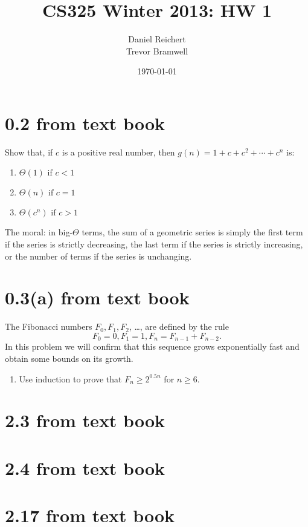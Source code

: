 \documentclass[12pt]{article}
\title{CS325 Winter 2013: HW 1}
\author{
    Daniel Reichert \\
    Trevor Bramwell
}
\date{\today}
\begin{document}
\maketitle

\section*{0.2 from text book}
Show that, if $c$ is a positive real number, then $g(n)=1+c+c^2+\cdots+c^n$ is:

\begin{enumerate}
\item $\Theta(1) \text{ if } c < 1$
\item $\Theta(n) \text{ if } c = 1$
\item $\Theta(c^n) \text{ if } c > 1$
\end{enumerate}

The moral: in big-$\Theta$ terms, the sum of a geometric series is simply the
first term if the series is
strictly decreasing, the last term if the series is strictly increasing,
or the number of terms if the
series is unchanging.

\section*{0.3(a) from text book}

The Fibonacci numbers $F_0, F_1, F_2$, \ldots, are defined by the rule
\[ F_0 = 0, F_1 = 1, F_n = F_{n - 1} + F_{n - 2}. \]
In this problem we will confirm that this sequence grows exponentially
fast and obtain some
bounds on its growth.
\begin{enumerate}
\item Use induction to prove that $F_n \geq 2^{0.5n}$ for $n \geq 6$.
\end{enumerate}

\section*{2.3 from text book}

\section*{2.4 from text book}

\section*{2.17 from text book}
\end{document}

